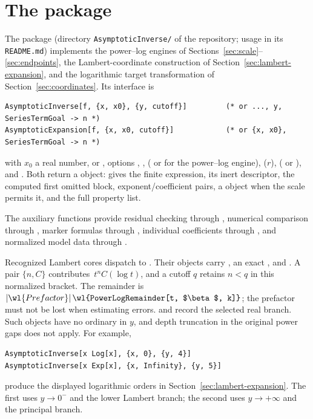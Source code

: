 \section{The package}
\label{sec:package}

The package  (directory \texttt{AsymptoticInverse/} of the repository; usage in its \texttt{README.md}) implements the power--log engines of Sections~\ref{sec:scale}--\ref{sec:endpoints}, the Lambert-coordinate construction of Section~\ref{sec:lambert-expansion}, and the logarithmic target transformation of Section~\ref{sec:coordinates}. Its interface is
\begin{lstlisting}
AsymptoticInverse[f, {x, x0}, {y, cutoff}]         (* or ..., y, SeriesTermGoal -> n *)
AsymptoticExpansion[f, {x, x0, cutoff}]            (* or {x, x0}, SeriesTermGoal -> n *)
\end{lstlisting}
with $x_0$ a real number,  or , options , ,  ( or  for the power--log engine),  ($r$),  ( or ),  and . Both return a  object:  gives the finite expression,  its inert descriptor,  the computed first omitted block,  exponent/coefficient pairs,  a  object when the scale permits it, and  the full property list.

The auxiliary functions provide residual checking through , numerical comparison through , marker formulas through , individual coefficients through , and normalized model data through .

Recognized Lambert cores dispatch to . Their objects carry , an exact , and . A pair $\{n,C\}$ contributes $\,t^nC(\log t)$, and a cutoff $q$ retains $n<q$ in this normalized bracket. The remainder is $|\wl{Prefactor}|\,\wl{PowerLogRemainder[t, $\beta$, k]}$; the prefactor must not be lost when estimating errors.  and  record the selected real branch. Such objects have no ordinary  in $y$, and depth truncation in the original power gaps does not apply. For example,
\begin{lstlisting}
AsymptoticInverse[x Log[x], {x, 0}, {y, 4}]
AsymptoticInverse[x Exp[x], {x, Infinity}, {y, 5}]
\end{lstlisting}
produce the displayed logarithmic orders in Section~\ref{sec:lambert-expansion}. The first uses $y\to0^-$ and the lower Lambert branch; the second uses $y\to+\infty$ and the principal branch.

